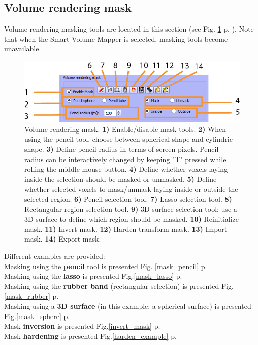 \subsection{Volume rendering mask}\label{volume_rendering_masking}
Volume rendering masking tools are located in this section (see Fig. \ref{volume_masking} p. \pageref{volume_masking}). Note that when the Smart Volume Mapper is selected, masking tools become unavailable.
\begin{figure}
  \centering
  \includegraphics[scale=1]{images/14/volume_masking2.png}
\caption{Volume rendering mask.  \textbf{1)} Enable/disable mask tools. \textbf{2)} When using the pencil tool, choose between spherical shape and cylindric shape.  \textbf{3)} Define pencil radius in terms of screen pixels. Pencil radius can be interactively changed by keeping "T" pressed while rolling the middle mouse button.  \textbf{4)} Define whether voxels laying inside the selection should be masked or unmasked. \textbf{5)} Define whether selected voxels to mask/unmask laying inside or outside the selected region. \textbf{6)} Pencil selection tool. \textbf{7)} Lasso selection tool. \textbf{8)} Rectangular region selection tool.  \textbf{9)} 3D surface selection tool: use a 3D surface to define which region should be masked. \textbf{10)} Reinitialize mask. \textbf{11)} Invert mask. \textbf{12)} Harden transform mask. \textbf{13)} Import mask. \textbf{14)} Export mask.}	
\label{volume_masking}

 \end{figure}
Different examples are provided:\\
Masking using the \textbf{pencil} tool is presented Fig. \ref{mask_pencil} p.\pageref{mask_pencil}\\
Masking using the \textbf{lasso} is presented Fig.\ref{mask_lasso} p.\pageref{mask_lasso}\\
Masking using the \textbf{rubber band} (rectangular selection) is presented Fig.\ref{mask_rubber} p. \pageref{mask_rubber}\\
Masking using a \textbf{3D surface} (in this example: a spherical surface) is presented Fig.\ref{mask_sphere} p. \pageref{mask_sphere}\\
Mask \textbf{inversion} is presented Fig.\ref{invert_mask} p. \pageref{invert_mask}\\
Mask \textbf{hardening} is presented Fig.\ref{harden_example} p. \pageref{harden_example}\\

